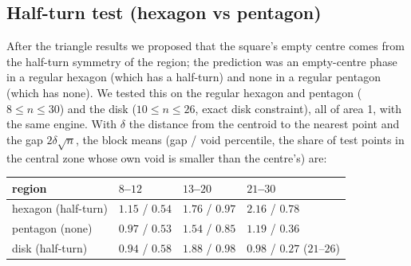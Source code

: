 \documentclass[11pt]{amsart}
\theoremstyle{definition}
\begin{document}
\subsection{Half-turn test (hexagon vs pentagon)}\label{sec:halfturn}
After the triangle results we proposed that the square's empty centre comes from the half-turn symmetry of the region; the prediction was an empty-centre phase in a regular hexagon (which has a half-turn) and none in a regular pentagon (which has none). We tested this on the regular hexagon and pentagon ($8 \le n \le 30$) and the disk ($10 \le n \le 26$, exact disk constraint), all of area 1, with the same engine. %
With $\delta$ the distance from the centroid to the nearest point and the gap $2\delta\sqrt n$, the block means (gap / void percentile, the share of test points in the central zone whose own void is smaller than the centre's) are:
\begin{center}\small
\begin{tabular}{@{}llll@{}}
\toprule
region & $8$--$12$ & $13$--$20$ & $21$--$30$ \\
\midrule
hexagon (half-turn) & $1.15$ / $0.54$ & $1.76$ / $0.97$ & $2.16$ / $0.78$ \\
pentagon (none) & $0.97$ / $0.53$ & $1.54$ / $0.85$ & $1.19$ / $0.36$ \\
disk (half-turn) & $0.94$ / $0.58$ & $1.88$ / $0.98$ & $0.98$ / $0.27$ ($21$--$26$) \\
\bottomrule
\end{tabular}
\end{center}
\end{document}
